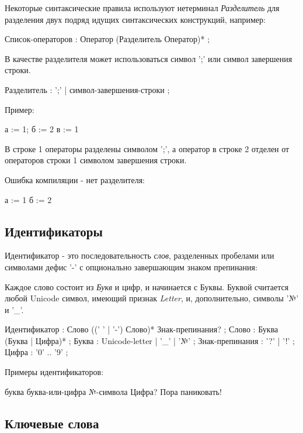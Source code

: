 Некоторые синтаксические правила используют нетерминал \emph{Разделитель} для разделения двух подряд идущих синтаксических конструкций, например:
\begin{Grammar}
Список-операторов
    : Оператор (Разделитель Оператор)* 
    ;
\end{Grammar}

В качестве разделителя может использоваться символ ';' или символ завершения строки.
\begin{Grammar}
Разделитель
    : ';'
    | символ-завершения-строки
    ;   
\end{Grammar}

Пример:
\begin{Trivil}
а := 1; б := 2
в := 1 
\end{Trivil}

В строке 1 операторы разделены символом ';', а оператор в строке 2 отделен от операторов строки 1 символом завершения строки.

Ошибка компиляции - нет разделителя:
\begin{SampleErr}
а := 1 б := 2
\end{SampleErr}

\hypertarget{idents}{%
\subsection{Идентификаторы}\label{lex:idents}}

Идентификатор - это последовательность \emph{слов}, разделенных пробелами или символами дефис '-' с опционально завершающим знаком препинания:

Каждое слово состоит из \emph{Букв} и цифр, и начинается с Буквы. Буквой считается любой Unicode символ, имеющий признак \emph{Letter}, и, дополнительно, символы '№'
и '\_'. 

\begin{Grammar}
Идентификатор
    : Слово ((' ' | '-') Слово)* Знак-препинания?
    ;
Слово
    : Буква (Буква | Цифра)*
    ;
Буква
    : Unicode-letter
    | '_'
    | '№'
    ;
Знак-препинания
    : '?' 
    | '!' 
    ;
Цифра
    : '0' .. '9'
    ;
\end{Grammar}

Примеры идентификаторов:
\begin{Trivil}
буква
буква-или-цифра
№-символа
Цифра?
Пора паниковать!
\end{Trivil}

\hypertarget{keywords}{%
\subsection{Ключевые слова}\label{lex:keywords}}

